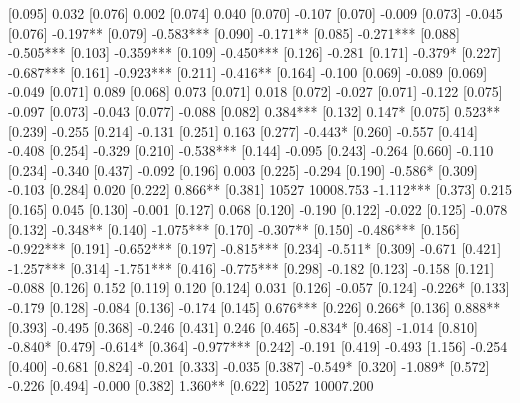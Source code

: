 [0.095] 0.032 [0.076] 0.002 [0.074] 0.040 [0.070] -0.107 [0.070] -0.009 [0.073] -0.045 [0.076] -0.197** [0.079] -0.583*** [0.090] -0.171** [0.085] -0.271*** [0.088] -0.505*** [0.103] -0.359*** [0.109] -0.450*** [0.126] -0.281 [0.171] -0.379* [0.227] -0.687*** [0.161] -0.923*** [0.211] -0.416** [0.164] -0.100 [0.069] -0.089 [0.069] -0.049 [0.071] 0.089 [0.068] 0.073 [0.071] 0.018 [0.072] -0.027 [0.071] -0.122 [0.075] -0.097 [0.073] -0.043 [0.077] -0.088 [0.082] 0.384*** [0.132] 0.147* [0.075] 0.523** [0.239] -0.255 [0.214] -0.131 [0.251] 0.163 [0.277] -0.443* [0.260] -0.557 [0.414] -0.408 [0.254] -0.329 [0.210] -0.538*** [0.144] -0.095 [0.243] -0.264 [0.660] -0.110 [0.234] -0.340 [0.437] -0.092 [0.196] 0.003 [0.225] -0.294 [0.190] -0.586* [0.309] -0.103 [0.284] 0.020 [0.222] 0.866** [0.381] 10527   10008.753 -1.112*** [0.373] 0.215 [0.165] 0.045 [0.130] -0.001 [0.127] 0.068 [0.120] -0.190 [0.122] -0.022 [0.125] -0.078 [0.132] -0.348** [0.140] -1.075*** [0.170] -0.307** [0.150] -0.486*** [0.156] -0.922*** [0.191] -0.652*** [0.197] -0.815*** [0.234] -0.511* [0.309] -0.671 [0.421] -1.257*** [0.314] -1.751*** [0.416] -0.775*** [0.298] -0.182 [0.123] -0.158 [0.121] -0.088 [0.126] 0.152 [0.119] 0.120 [0.124] 0.031 [0.126] -0.057 [0.124] -0.226* [0.133] -0.179 [0.128] -0.084 [0.136] -0.174 [0.145] 0.676*** [0.226] 0.266* [0.136] 0.888** [0.393] -0.495 [0.368] -0.246 [0.431] 0.246 [0.465] -0.834* [0.468] -1.014 [0.810] -0.840* [0.479] -0.614* [0.364] -0.977*** [0.242] -0.191 [0.419] -0.493 [1.156] -0.254 [0.400] -0.681 [0.824] -0.201 [0.333] -0.035 [0.387] -0.549* [0.320] -1.089* [0.572] -0.226 [0.494] -0.000 [0.382] 1.360** [0.622] 10527   10007.200
